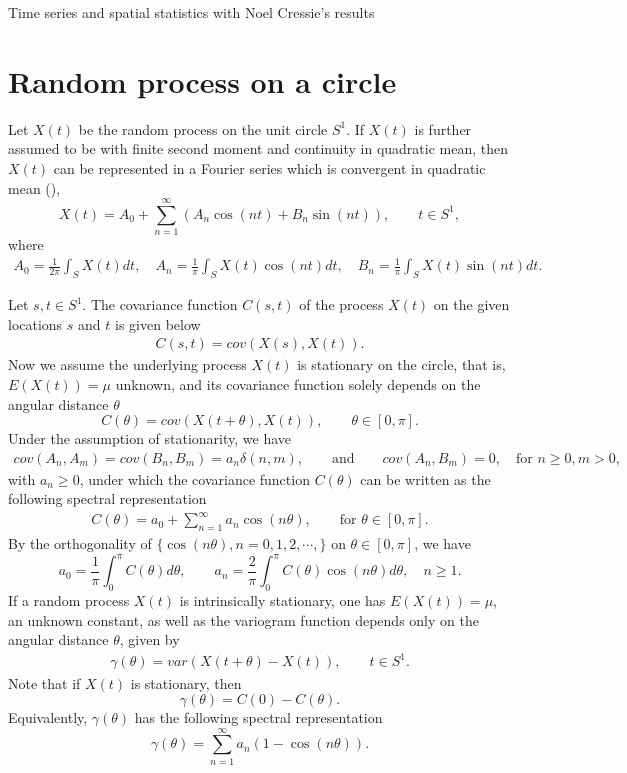 
 Time series and spatial statistics with Noel Cressie's results \\

\section{Random process on a circle}

Let $X(t)$ be the random process on the unit circle $S^1$. If $X(t)$ is further assumed to be with finite second moment and continuity in quadratic mean, then $X(t)$ can be represented in a Fourier series which is convergent in quadratic mean (\cite{DUFOUR1976107}),
\[
X(t) = A_0 + \sum_{n=1}^\infty (A_n\cos(nt) + B_n \sin(nt)), \quad \quad t \in S^1,
\]
where
\begin{eqnarray*}
A_0 = \frac{1}{2\pi}\int_S X(t)dt, \quad A_n = \frac{1}{\pi}\int_S X(t)\cos(nt)dt, \quad B_n = \frac{1}{\pi}\int_S X(t)\sin(nt)dt.
\end{eqnarray*}

Let $s, t \in S^1$. The covariance function $C(s, t)$ of the process $X(t)$ on the given locations $s$ and $t$ is given below
\begin{eqnarray*}
C(s, t) = cov(X(s), X(t)).
\end{eqnarray*}
Now we assume the underlying process $X(t)$ is stationary on the circle, that is, $E(X(t)) = \mu$ unknown, and its covariance function solely depends on the angular distance $\theta$
\[
C(\theta) = cov(X(t+\theta), X(t)), \quad \quad \theta \in [0, \pi].
\]
Under the assumption of stationarity, we have
\begin{eqnarray*}
cov(A_n, A_m) = cov(B_n, B_m) = a_n \delta(n, m), \quad \quad \mbox{and} \quad \quad cov(A_n, B_m) = 0, \quad \mbox{for $n \ge 0, m > 0$},
\end{eqnarray*}
with $a_n \ge 0$, under which the covariance function $C(\theta)$ can be written as the following spectral representation
\begin{eqnarray*}
C(\theta) = a_0 + \sum_{n=1}^\infty a_n \cos(n\theta), \quad \quad \mbox{for $\theta \in [0, \pi]$}.
\end{eqnarray*}
By the orthogonality of $\{\cos(n\theta), n = 0, 1, 2, \cdots,\}$ on $\theta \in [0, \pi]$, we have
\[
a_0 = \frac{1}{\pi}\int_0^\pi C(\theta)d\theta, \quad \quad a_n = \frac{2}{\pi}\int_0^\pi C(\theta)\cos(n\theta)d\theta, \quad n \ge 1.
\]
If a random process $X(t)$ is intrinsically stationary, one has $E(X(t)) = \mu$, an unknown constant, as well as the variogram function depends only on the angular distance $\theta$, given by
\begin{eqnarray*}
\gamma(\theta) = var(X(t+\theta) - X(t)), \quad \quad t \in S^1.
\end{eqnarray*}
Note that if $X(t)$ is stationary, then
\[
\gamma(\theta) = C(0) - C(\theta).
\]
Equivalently, $\gamma(\theta)$ has the following spectral representation
\[
\gamma(\theta) = \sum_{n = 1}^\infty a_n (1 - \cos(n\theta)).
\]

